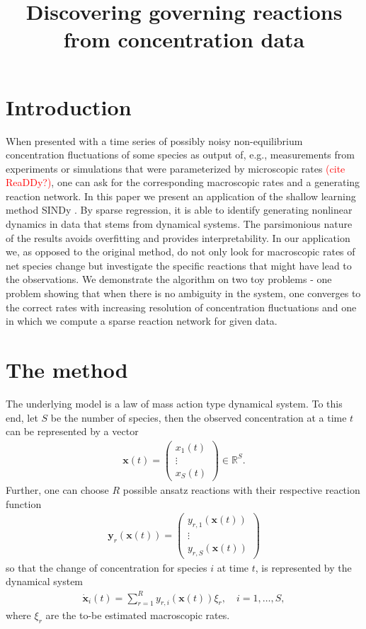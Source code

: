 \documentclass[oneside, abstracton, titlepage]{scrartcl}
\begin{document}
	\title{Discovering governing reactions from concentration data}
	\maketitle

	\section{Introduction}
	When presented with a time series of possibly noisy non-equilibrium concentration fluctuations of some species as output of, e.g., measurements from experiments or simulations that were parameterized by microscopic rates \textcolor{red}{(cite ReaDDy?)}, one can ask for the corresponding macroscopic rates and a generating reaction network.
	In this paper we present an application of the shallow learning method SINDy \cite{Brunton2015}. By sparse regression, it is able to identify generating nonlinear dynamics in data that stems from dynamical systems. The parsimonious nature of the results avoids overfitting and provides interpretability.
	In our application we, as opposed to the original method, do not only look for macroscopic rates of net species change but investigate the specific reactions that might have lead to the observations.
	We demonstrate the algorithm on two toy problems - one problem showing that when there is no ambiguity in the system, one converges to the correct rates with increasing resolution of concentration fluctuations and one in which we compute a sparse reaction network for given data.

	\section{The method}
	The underlying model is a law of mass action type dynamical system. To this end, let $S$ be the number of species, then the observed concentration at a time $t$ can be represented by a vector
	\begin{align}
	\mathbf{x}(t)=\begin{pmatrix}
	x_1(t)\\ \vdots \\ x_S(t)
	\end{pmatrix}\in \mathbb{R}^S.
	\end{align}
	Further, one can choose $R$ possible ansatz reactions with their respective reaction function
	\begin{align}
	\textbf{y}_r(\textbf{x}(t))=\begin{pmatrix}
	y_{r,1}(\textbf{x}(t)) \\ \vdots \\ y_{r,S}(\textbf{x}(t))
	\end{pmatrix}
	\end{align}
	so that the change of concentration for species $i$ at time $t$, is represented by the dynamical system
	\begin{align}
	\dot{\textbf{x}}_i(t) = \sum_{r=1}^{R}y_{r,i}(\textbf{x}(t))\xi_r,\quad i=1,\ldots, S,
	\label{method:the-system}\end{align}
	where $\xi_r$ are the to-be estimated macroscopic rates.
\end{document}
